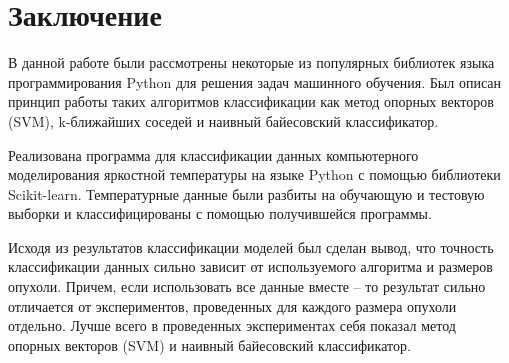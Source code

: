 \newpage
\section{Заключение}
В данной работе были рассмотрены некоторые из популярных библиотек языка программирования Python для решения задач машинного обучения. Был описан принцип работы таких алгоритмов классификации как метод опорных векторов (SVM), k-ближайших соседей и наивный байесовский классификатор.
\par
Реализована программа для классификации данных компьютерного моделирования яркостной температуры на языке Python с помощью библиотеки Scikit-learn. Температурные данные были разбиты на обучающую и тестовую выборки и классифицированы с помощью получившейся программы.
\par
Исходя из результатов классификации моделей был сделан вывод, что точность классификации данных сильно зависит от используемого алгоритма и размеров опухоли. Причем, если использовать все данные вместе -- то результат сильно отличается от экспериментов, проведенных для каждого размера опухоли отдельно. Лучше всего в проведенных экспериментах себя показал метод опорных векторов (SVM) и наивный байесовский классификатор.
